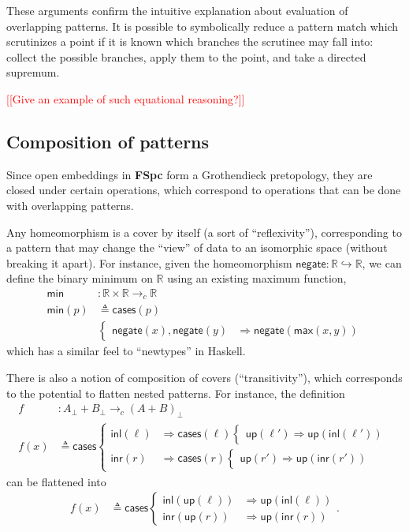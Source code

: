 \documentclass[conference]{IEEEtran}
\newcommand{\hookto}{\hookrightarrow}
\newcommand{\cto}{\to_c}
\newcommand{\R}{\mathbb{R}}
\newcommand{\negate}{\mathsf{negate}}
\newcommand{\Branch}{\Rightarrow}
\newcommand{\note}[1]{\textcolor{red}{[[{#1}]]}}
\newcommand{\up}{\mathsf{up}}
\begin{document}
These arguments confirm the intuitive explanation about evaluation of overlapping patterns. It is possible to symbolically reduce a pattern match which scrutinizes a point if it is known which branches the scrutinee may fall into: collect the possible branches, apply them to the point, and take a directed supremum.

\note{Give an example of such equational reasoning?}


\subsection{Composition of patterns}

Since open embeddings in \textbf{FSpc} form a Grothendieck pretopology, they are closed under certain operations, which correspond to operations that can be done with overlapping patterns.

Any homeomorphism is a cover by itself (a sort of ``reflexivity''), corresponding to a pattern that may change the ``view'' of data to an isomorphic space (without breaking it apart). For instance, given the homeomorphism $\negate : \R \hookto \R$, we can define the binary minimum on $\R$ using an existing maximum function,
\begin{align*}
\mathsf{min} &: \R \times \R \cto \R
\\ \mathsf{min}(p) &\triangleq \mathsf{cases}(p)
\\ &\begin{cases}
\negate(x), \negate(y) &\Branch \negate(\mathsf{max}(x, y))
\end{cases}
\end{align*}
which has a similar feel to ``newtypes'' in Haskell.

There is also a notion of composition of covers (``transitivity''), which corresponds to the potential to flatten nested patterns. For instance, the definition
\begin{align*}
f &: A_\bot + B_\bot \cto \left(A + B\right)_\bot
\\ f(x) &\triangleq \mathsf{cases}
\begin{cases}
\mathsf{inl}(\ell) &\Branch \mathsf{cases}(\ell)
  \begin{cases}
  \up(\ell') \Branch \up(\mathsf{inl}(\ell'))
  \end{cases}
\\
\mathsf{inr}(r) &\Branch \mathsf{cases}(r)
  \begin{cases}
  \up(r') \Branch \up(\mathsf{inr}(r'))
  \end{cases}
\end{cases}
\end{align*}
can be flattened into
\begin{align*}
f(x) &\triangleq \mathsf{cases}
\begin{cases}
\mathsf{inl}(\up(\ell)) &\Branch \up(\mathsf{inl}(\ell))
\\
\mathsf{inr}(\up(r)) &\Branch \up(\mathsf{inr}(r))
\end{cases}.
\end{align*}
\end{document}
